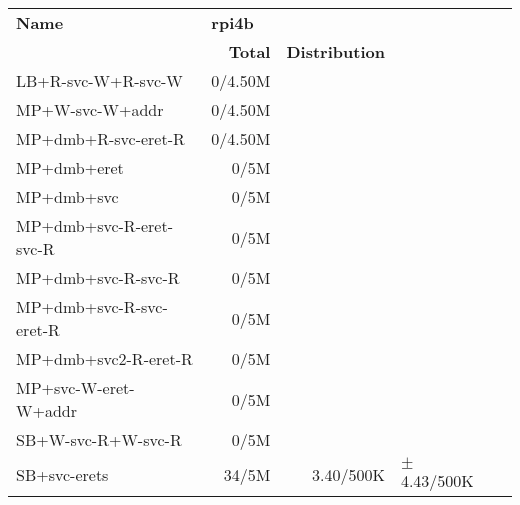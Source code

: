 \begin{tabular}{l  | r r l l}
   \textbf{Name}           & \multicolumn{3}{l}{\textbf{rpi4b}}                       & \\
                           & \textbf{Total} & \textbf{Distribution} &                 & \\
        LB+R-svc-W+R-svc-W &        0/4.50M &                       &                 & \\ \hline 
           MP+W-svc-W+addr &        0/4.50M &                       &                 & \\ \hline 
       MP+dmb+R-svc-eret-R &        0/4.50M &                       &                 & \\ \hline 
               MP+dmb+eret &           0/5M &                       &                 & \\ \hline 
                MP+dmb+svc &           0/5M &                       &                 & \\ \hline 
   MP+dmb+svc-R-eret-svc-R &           0/5M &                       &                 & \\ \hline 
        MP+dmb+svc-R-svc-R &           0/5M &                       &                 & \\ \hline 
   MP+dmb+svc-R-svc-eret-R &           0/5M &                       &                 & \\ \hline 
      MP+dmb+svc2-R-eret-R &           0/5M &                       &                 & \\ \hline 
      MP+svc-W-eret-W+addr &           0/5M &                       &                 & \\ \hline 
        SB+W-svc-R+W-svc-R &           0/5M &                       &                 & \\ \hline 
              SB+svc-erets &          34/5M &             3.40/500K & $\pm$ 4.43/500K & \\ \hline 
\end{tabular}
